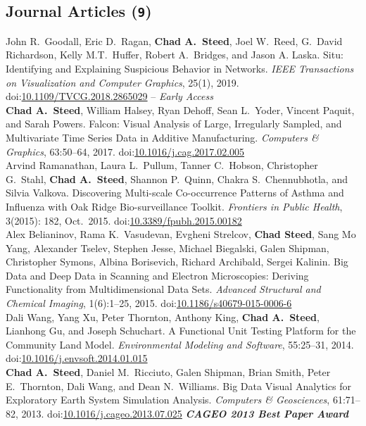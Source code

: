 \documentclass[11pt, letterpaper]{article}
\newcommand{\amper}{{\fontspec[Scale=.95]{Hoefler Text}\selectfont\itshape\&}}
\newcommand{\years}[1]{\marginnote{\scriptsize #1}}
\begin{document}
\subsection*{Journal Articles (\texttt{9})}
\begin{sloppypar}
\noindent\years{2019}John R.\ Goodall, Eric D.\ Ragan, \textbf{Chad A.\ Steed},
Joel W.\ Reed, G.\ David Richardson, Kelly M.T.\ Huffer, Robert A.\ Bridges, and Jason A. Laska. Situ: Identifying and Explaining Suspicious Behavior in Networks. \emph{IEEE Transactions on Visualization and Computer Graphics}, 25(1), 2019. doi:\href{http://dx.doi.org/10.1109/TVCG.2018.2865029}
{10.1109/TVCG.2018.2865029} -- \emph{Early Access}\\
\years{2017}\textbf{Chad A.\ Steed}, William Halsey, Ryan Dehoff,
Sean L.\ Yoder, Vincent Paquit, and Sarah Powers.  Falcon: Visual Analysis of Large, Irregularly Sampled, and Multivariate Time Series Data in Additive Manufacturing. \emph{Computers \& Graphics}, 63:50--64, 2017. doi:\href{http://dx.doi.org/10.1016/j.cag.2017.02.005}
{10.1016/j.cag.2017.02.005}\\
\years{2015}Arvind Ramanathan, Laura L.\ Pullum, Tanner C.\ Hobson,
Christopher G.\ Stahl, \textbf{Chad A.\ Steed}, Shannon P.\ Quinn,
Chakra S.\ Chennubhotla, and Silvia Valkova.  Discovering Multi-scale
Co-occurrence Patterns of Asthma and Influenza with Oak Ridge Bio-surveillance
Toolkit. \emph{Frontiers in Public Health}, 3(2015): 182, Oct.\ 2015.
doi:\href{http://dx.doi.org/10.3389/fpubh.2015.00182}
{10.3389/fpubh.2015.00182}\\
\years{2015}Alex Belianinov, Rama K.\ Vasudevan, Evgheni Strelcov,
\textbf{Chad Steed}, Sang Mo Yang, Alexander Tselev, Stephen Jesse,
Michael Biegalski, Galen Shipman, Christopher Symons, Albina Borisevich,
Richard Archibald, Sergei Kalinin.  Big Data and Deep Data in Scanning
and Electron Microscopies: Deriving Functionality from Multidimensional Data
Sets. \emph{Advanced Structural and Chemical Imaging}, 1(6):1--25, 2015.
doi:\href{http://dx.doi.org/10.1186/s40679-015-0006-6}
{10.1186/s40679-015-0006-6}\\
\years{2014}Dali Wang, Yang Xu, Peter Thornton, Anthony King,
\textbf{Chad A.\ Steed}, Lianhong Gu, and Joseph Schuchart.
A Functional Unit Testing Platform for the Community Land Model.
\emph{Environmental Modeling and Software}, 55:25--31, 2014.
doi:\href{http://dx.doi.org/10.1016/j.envsoft.2014.01.015}
{10.1016/j.envsoft.2014.01.015}\\
\years{2013}\textbf{Chad A.\ Steed}, Daniel M.\ Ricciuto, Galen Shipman,
Brian Smith, Peter E.\ Thornton, Dali Wang, and Dean N.\ Williams.
Big Data Visual Analytics for Exploratory Earth System Simulation Analysis.
\emph{Computers \amper{} Geosciences}, 61:71--82, 2013.
doi:\href{http://dx.doi.org/10.1016/j.cageo.2013.07.025}
{10.1016/j.cageo.2013.07.025}
\textbf{\emph{CAGEO 2013 Best Paper Award}}\\


\end{sloppypar}
\end{document}
